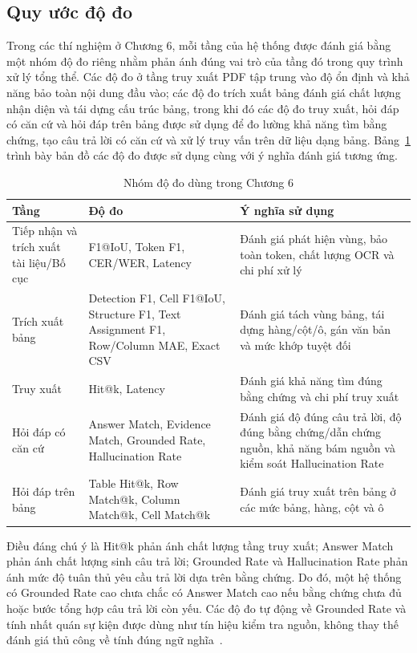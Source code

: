 \documentclass[../DoAn.tex]{subfiles}
\begin{document}
\subsection{Quy ước độ đo}

Trong các thí nghiệm ở Chương 6, mỗi tầng của hệ thống được đánh giá bằng một nhóm độ đo riêng nhằm phản ánh đúng vai trò của tầng đó trong quy trình xử lý tổng thể. Các độ đo ở tầng truy xuất PDF tập trung vào độ ổn định và khả năng bảo toàn nội dung đầu vào; các độ đo trích xuất bảng đánh giá chất lượng nhận diện và tái dựng cấu trúc bảng, trong khi đó các độ đo truy xuất, hỏi đáp có căn cứ và hỏi đáp trên bảng được sử dụng để đo lường khả năng tìm bằng chứng, tạo câu trả lời có căn cứ và xử lý truy vấn trên dữ liệu dạng bảng. Bảng~\ref{tab:metric-groups-chapter6} trình bày bản đồ các độ đo được sử dụng cùng với ý nghĩa đánh giá tương ứng.


\begin{table}[H]
\centering
\caption{Nhóm độ đo dùng trong Chương 6}
\label{tab:metric-groups-chapter6}
\small
\begin{tabularx}{\textwidth}{|
>{\raggedright\arraybackslash}p{}|
>{\raggedright\arraybackslash}p{}|
>{\raggedright\arraybackslash}X|
}
\hline
\textbf{Tầng} & \textbf{Độ đo} & \textbf{Ý nghĩa sử dụng} \\
\hline
Tiếp nhận và trích xuất tài liệu/Bố cục & F1@IoU, Token F1, CER/WER, Latency & Đánh giá phát hiện vùng, bảo toàn token, chất lượng OCR và chi phí xử lý \\
\hline
Trích xuất bảng & Detection F1, Cell F1@IoU, Structure F1, Text Assignment F1, Row/Column MAE, Exact CSV & Đánh giá tách vùng bảng, tái dựng hàng/cột/ô, gán văn bản và mức khớp tuyệt đối \\
\hline
Truy xuất & Hit@k, Latency & Đánh giá khả năng tìm đúng bằng chứng và chi phí truy xuất \\
\hline
Hỏi đáp có căn cứ & Answer Match, Evidence Match, Grounded Rate, Hallucination Rate & Đánh giá độ đúng câu trả lời, độ đúng bằng chứng/dẫn chứng nguồn, khả năng bám nguồn và kiểm soát Hallucination Rate \\
\hline
Hỏi đáp trên bảng & Table Hit@k, Row Match@k, Column Match@k, Cell Match@k & Đánh giá truy xuất trên bảng ở các mức bảng, hàng, cột và ô \\
\hline
\end{tabularx}
\end{table}
Điều đáng chú ý là Hit@k phản ánh chất lượng tầng truy xuất; Answer Match phản ánh chất lượng sinh câu trả lời; Grounded Rate và Hallucination Rate phản ánh mức độ tuân thủ yêu cầu trả lời dựa trên bằng chứng. Do đó, một hệ thống có Grounded Rate cao chưa chắc có Answer Match cao nếu bằng chứng chưa đủ hoặc bước tổng hợp câu trả lời còn yếu. Các độ đo tự động về Grounded Rate và tính nhất quán sự kiện được dùng như tín hiệu kiểm tra nguồn, không thay thế đánh giá thủ công về tính đúng ngữ nghĩa~\cite{fabbri2021qafacteval,es2023ragas,ji2023hallucination}.
\end{document}
